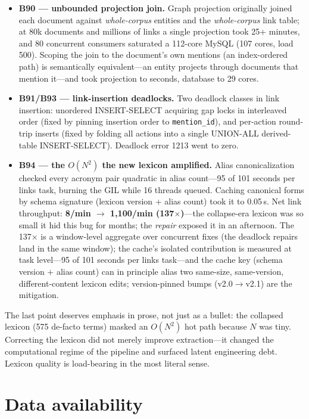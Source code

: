 \documentclass[preprint,12pt]{elsarticle}
\begin{document}
\begin{itemize}
\item \textbf{B90 --- unbounded projection join.} Graph projection
originally joined each document against \emph{whole-corpus} entities and the
\emph{whole-corpus} link table; at 80k documents and millions of links a
single projection took 25+ minutes, and 80 concurrent consumers saturated a
112-core MySQL (107 cores, load 500). Scoping the join to the document's own
mentions (an index-ordered path) is semantically equivalent---an entity
projects through documents that mention it---and took projection to
seconds, database to 29 cores.
\item \textbf{B91/B93 --- link-insertion deadlocks.} Two deadlock classes in
link insertion: unordered INSERT-SELECT acquiring gap locks in interleaved
order (fixed by pinning insertion order to \texttt{mention\_id}), and
per-action round-trip inserts (fixed by folding all actions into a single
UNION-ALL derived-table INSERT-SELECT). Deadlock error 1213 went to zero.
\item \textbf{B94 --- the $O(N^2)$ the new lexicon amplified.} Alias
canonicalization checked every acronym pair quadratic in alias count---95
of 101 seconds per links task, burning the GIL while 16 threads queued.
Caching canonical forms by schema signature (lexicon version + alias count)
took it to 0.05\,s. Net link throughput: \textbf{8/min $\to$ 1{,}100/min
(137$\times$)}---the collapse-era lexicon was so small it hid this bug for
months; the \emph{repair} exposed it in an afternoon. The 137$\times$ is a
window-level aggregate over concurrent fixes (the deadlock repairs land
in the same window); the cache's isolated contribution is measured at
task level---95 of 101 seconds per links task---and the cache key
(schema version $+$ alias count) can in principle alias two same-size,
same-version, different-content lexicon edits; version-pinned bumps
(v2.0$\to$v2.1) are the mitigation.
\end{itemize}

The last point deserves emphasis in prose, not just as a bullet: the
collapsed lexicon (575 de-facto terms) masked an $O(N^2)$ hot path because
$N$ was tiny. Correcting the lexicon did not merely improve extraction---it
changed the computational regime of the pipeline and surfaced latent
engineering debt. Lexicon quality is load-bearing in the most literal sense.


\section*{Data availability}
\end{document}
